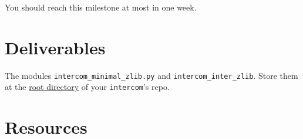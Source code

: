 You should reach this milestone at most in one week.

\section{Deliverables}

The modules \texttt{intercom\_minimal\_zlib.py} and
\texttt{intercom\_inter\_zlib}. Store them at the
\href{https://github.com/Tecnologias-multimedia/intercom}{root
  directory} of your \texttt{intercom}'s repo.

\section{Resources}


